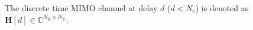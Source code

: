 \documentclass[journal]{IEEEtran}
\newcommand{\vw}[1]{\mathbf{w}_{#1}}
\newcommand{\tx}[0]{\text{T}}
\newcommand{\rx}[0]{\text{R}}
\newcommand{\hermitian}[0]{\text{H}}
\newcommand{\ie}[0]{\textit{i.e.}}
\begin{document}
The discrete time MIMO channel at delay $d$ ($d<N_{\text{c}}$) is denoted as $\mathbf{H}[d]\in \mathbb{C}^{N_{\rx}\times N_{\tx}}$. 
%
%
\end{document}
